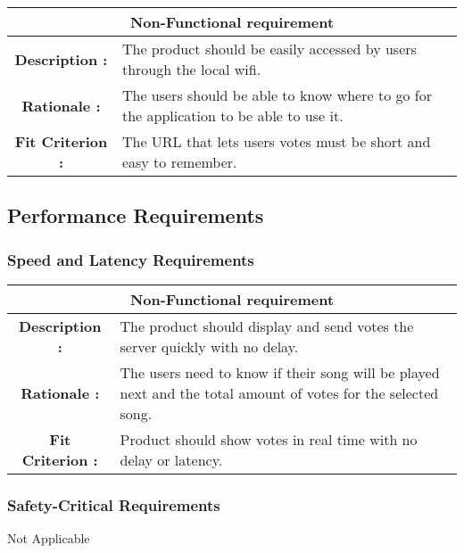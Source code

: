 \documentclass[12pt, titlepage]{article}
\begin{document}
\begin{center}
\begin{table}[H]
\begin{tabularx}{\textwidth}{| c X |}
\hline
\multicolumn{2}{|c|}{\textbf{Non-Functional requirement}}\\
\hline
\textbf{Description : } & The product should be easily accessed by users through the local wifi.\\
\hline
\textbf{Rationale : } & The users should be able to know where to go for the application to be able to use it.\\
\hline
\textbf{Fit Criterion : } & The URL that lets users votes must be short and easy to remember.\\
\hline
\end{tabularx}
\end{table}
\end{center}



\subsection{Performance Requirements}
\subsubsection{Speed and Latency Requirements}

\begin{center}
\begin{table}[H]
\begin{tabularx}{\textwidth}{| c X |}
\hline
\multicolumn{2}{|c|}{\textbf{Non-Functional requirement}}\\
\hline
\textbf{Description : } &The product should display and send votes the server quickly with no delay.\\
\hline
\textbf{Rationale : } & The users need to know if their song will be played next and the total amount of votes for the selected song.\\
\hline
\textbf{Fit Criterion : } & Product should show votes in real time with no delay or latency.\\
\hline
\end{tabularx}
\end{table}
\end{center}


\subsubsection{Safety-Critical Requirements}
Not Applicable
\end{document}
